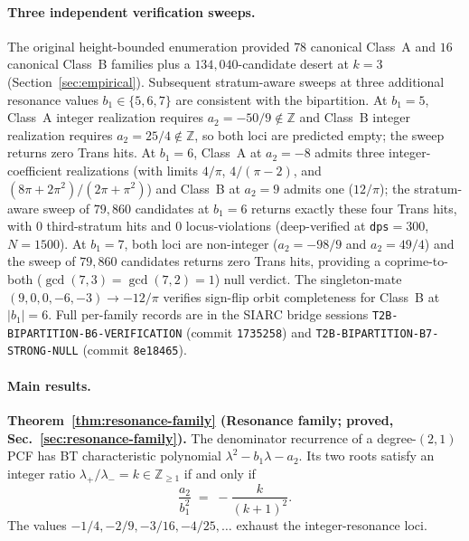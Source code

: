 \documentclass[11pt,a4paper]{article}
\theoremstyle{definition}
\begin{document}
\paragraph{Three independent verification sweeps.}
The original height-bounded enumeration provided $78$ canonical Class~A and $16$ canonical Class~B families plus a $134{,}040$-candidate desert at $k=3$ (Section~\ref{sec:empirical}). Subsequent stratum-aware sweeps at three additional resonance values $b_1 \in \{5, 6, 7\}$ are consistent with the bipartition. At $b_1 = 5$, Class~A integer realization requires $a_2 = -50/9 \notin \mathbb{Z}$ and Class~B integer realization requires $a_2 = 25/4 \notin \mathbb{Z}$, so both loci are predicted empty; the sweep returns zero Trans hits. At $b_1 = 6$, Class~A at $a_2 = -8$ admits three integer-coefficient realizations (with limits $4/\pi$, $4/(\pi-2)$, and $(8\pi+2\pi^2)/(2\pi+\pi^2)$) and Class~B at $a_2 = 9$ admits one ($12/\pi$); the stratum-aware sweep of $79{,}860$ candidates at $b_1 = 6$ returns exactly these four Trans hits, with $0$ third-stratum hits and $0$ locus-violations (deep-verified at \texttt{dps}$=300$, $N=1500$). At $b_1 = 7$, both loci are non-integer ($a_2 = -98/9$ and $a_2 = 49/4$) and the sweep of $79{,}860$ candidates returns zero Trans hits, providing a coprime-to-both ($\gcd(7,3) = \gcd(7,2) = 1$) null verdict. The singleton-mate $(9, 0, 0, -6, -3) \to -12/\pi$ verifies sign-flip orbit completeness for Class~B at $|b_1|=6$. Full per-family records are in the SIARC bridge sessions \texttt{T2B-BIPARTITION-B6-VERIFICATION} (commit \texttt{1735258}) and \texttt{T2B-BIPARTITION-B7-STRONG-NULL} (commit \texttt{8e18465}).

\paragraph{Main results.}

\medskip
\noindent\textbf{Theorem~\ref{thm:resonance-family} (Resonance family; proved, Sec.~\ref{sec:resonance-family}).}
The denominator recurrence of a degree-$(2,1)$ PCF has BT characteristic polynomial $\lambda^2 - b_1\lambda - a_2$. Its two roots satisfy an integer ratio $\lambda_+/\lambda_- = k \in \mathbb{Z}_{\ge 1}$ if and only if
\begin{equation}\label{eq:resonance-loci}
  \frac{a_2}{b_1^2} \;=\; -\frac{k}{(k+1)^2}.
\end{equation}
The values $-1/4, -2/9, -3/16, -4/25, \ldots$ exhaust the integer-resonance loci.
\end{document}
